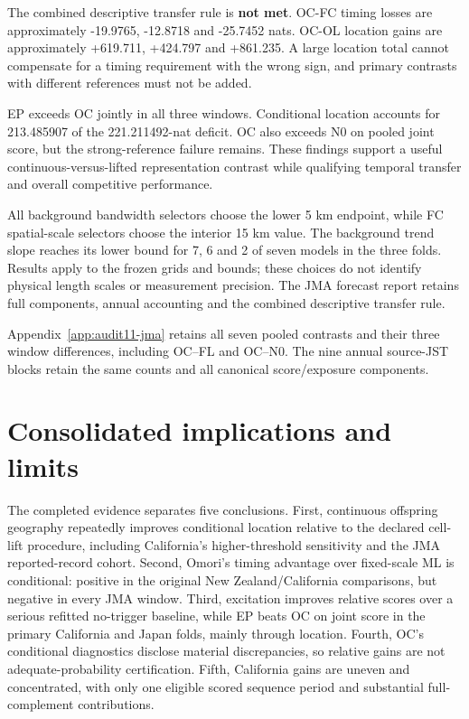 The combined descriptive transfer rule is \textbf{not met}. OC-FC timing losses are approximately -19.9765, -12.8718 and -25.7452 nats. OC-OL location gains are approximately +619.711, +424.797 and +861.235. A large location total cannot compensate for a timing requirement with the wrong sign, and primary contrasts with different references must not be added.

EP exceeds OC jointly in all three windows. Conditional location accounts for 213.485907 of the 221.211492-nat deficit. OC also exceeds N0 on pooled joint score, but the strong-reference failure remains. These findings support a useful continuous-versus-lifted representation contrast while qualifying temporal transfer and overall competitive performance.

All background bandwidth selectors choose the lower 5 km endpoint, while FC spatial-scale selectors choose the interior 15 km value. The background trend slope reaches its lower bound for 7, 6 and 2 of seven models in the three folds. Results apply to the frozen grids and bounds; these choices do not identify physical length scales or measurement precision. The JMA forecast report retains full components, annual accounting and the combined descriptive transfer rule.

Appendix~\ref{app:audit11-jma} retains all seven pooled contrasts and their three window differences, including OC--FL and OC--N0. The nine annual source-JST blocks retain the same counts and all canonical score/exposure components.

\section{Consolidated implications and limits}

The completed evidence separates five conclusions. First, continuous offspring geography repeatedly improves conditional location relative to the declared cell-lift procedure, including California's higher-threshold sensitivity and the JMA reported-record cohort. Second, Omori's timing advantage over fixed-scale ML is conditional: positive in the original New Zealand/California comparisons, but negative in every JMA window. Third, excitation improves relative scores over a serious refitted no-trigger baseline, while EP beats OC on joint score in the primary California and Japan folds, mainly through location. Fourth, OC's conditional diagnostics disclose material discrepancies, so relative gains are not adequate-probability certification. Fifth, California gains are uneven and concentrated, with only one eligible scored sequence period and substantial full-complement contributions.

